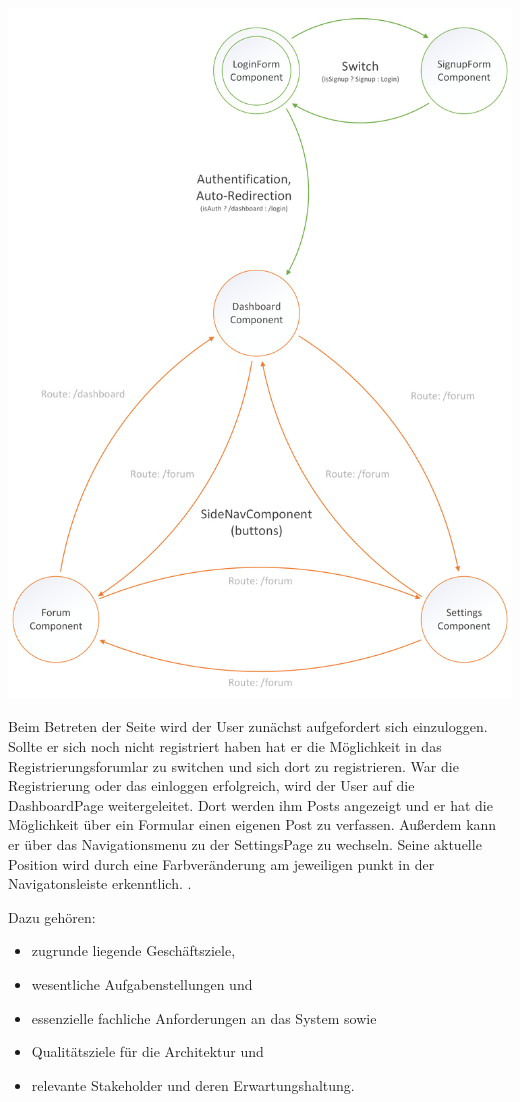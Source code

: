 \documentclass[]{article}
\begin{document}
\vspace{2cm}
\includegraphics{konzepte/bibnow_Navigationskonzept.png}
\vspace{2cm}

Beim Betreten der Seite wird der User zunächst aufgefordert sich einzuloggen. Sollte er sich noch nicht registriert haben hat er die Möglichkeit in das Registrierungsforumlar zu switchen und sich dort zu registrieren. War die Registrierung oder das einloggen erfolgreich, wird der User auf die DashboardPage weitergeleitet. Dort werden ihm Posts angezeigt und er hat die Möglichkeit über ein Formular einen eigenen Post zu verfassen. Außerdem kann er über das Navigationsmenu zu der SettingsPage zu wechseln. Seine aktuelle Position wird durch eine Farbveränderung am jeweiligen punkt in der Navigatonsleiste erkenntlich.
.
\pagebreak

Dazu gehören:

\begin{itemize}
\item
  zugrunde liegende Geschäftsziele,
\item
  wesentliche Aufgabenstellungen und
\item
  essenzielle fachliche Anforderungen an das System sowie
\item
  Qualitätsziele für die Architektur und
\item
  relevante Stakeholder und deren Erwartungshaltung.
\end{itemize}
\end{document}
